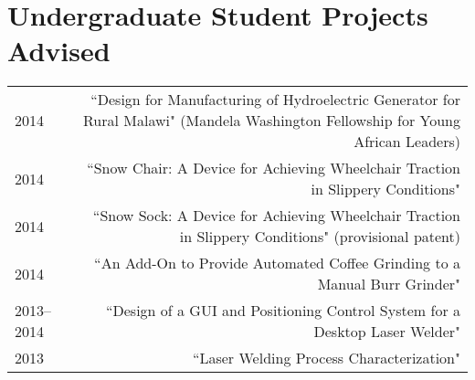 
\section*{Undergraduate Student Projects Advised}
\begin{tabular}{L!{\VRule}R}
2014&``Design for Manufacturing of Hydroelectric Generator for Rural Malawi" (Mandela Washington Fellowship for Young African Leaders)\\
2014&``Snow Chair: A Device for Achieving Wheelchair Traction in Slippery Conditions"\\
2014&``Snow Sock: A Device for Achieving Wheelchair Traction in Slippery Conditions" (provisional patent)\\
2014&``An Add-On to Provide Automated Coffee Grinding to a Manual Burr Grinder"\\
2013--2014&``Design of a GUI and Positioning Control System for a Desktop Laser Welder"\\
2013&``Laser Welding Process Characterization"\\
\end{tabular}
